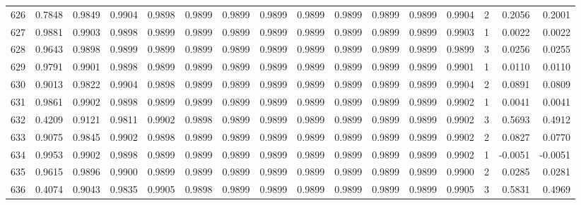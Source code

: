 \begin{tabular}{lrrrrrrrrrrrrrrr}
626 &      0.7848 &  0.9849 &  0.9904 &  0.9898 &  0.9899 &  0.9899 &  0.9899 &  0.9899 &  0.9899 &  0.9899 &   0.9899 &     0.9904 &      2 &                    0.2056 &                     0.2001 \\
627 &      0.9881 &  0.9903 &  0.9898 &  0.9899 &  0.9899 &  0.9899 &  0.9899 &  0.9899 &  0.9899 &  0.9899 &   0.9899 &     0.9903 &      1 &                    0.0022 &                     0.0022 \\
628 &      0.9643 &  0.9898 &  0.9899 &  0.9899 &  0.9899 &  0.9899 &  0.9899 &  0.9899 &  0.9899 &  0.9899 &   0.9899 &     0.9899 &      3 &                    0.0256 &                     0.0255 \\
629 &      0.9791 &  0.9901 &  0.9898 &  0.9899 &  0.9899 &  0.9899 &  0.9899 &  0.9899 &  0.9899 &  0.9899 &   0.9899 &     0.9901 &      1 &                    0.0110 &                     0.0110 \\
630 &      0.9013 &  0.9822 &  0.9904 &  0.9898 &  0.9899 &  0.9899 &  0.9899 &  0.9899 &  0.9899 &  0.9899 &   0.9899 &     0.9904 &      2 &                    0.0891 &                     0.0809 \\
631 &      0.9861 &  0.9902 &  0.9898 &  0.9899 &  0.9899 &  0.9899 &  0.9899 &  0.9899 &  0.9899 &  0.9899 &   0.9899 &     0.9902 &      1 &                    0.0041 &                     0.0041 \\
632 &      0.4209 &  0.9121 &  0.9811 &  0.9902 &  0.9898 &  0.9899 &  0.9899 &  0.9899 &  0.9899 &  0.9899 &   0.9899 &     0.9902 &      3 &                    0.5693 &                     0.4912 \\
633 &      0.9075 &  0.9845 &  0.9902 &  0.9898 &  0.9899 &  0.9899 &  0.9899 &  0.9899 &  0.9899 &  0.9899 &   0.9899 &     0.9902 &      2 &                    0.0827 &                     0.0770 \\
634 &      0.9953 &  0.9902 &  0.9898 &  0.9899 &  0.9899 &  0.9899 &  0.9899 &  0.9899 &  0.9899 &  0.9899 &   0.9899 &     0.9902 &      1 &                   -0.0051 &                    -0.0051 \\
635 &      0.9615 &  0.9896 &  0.9900 &  0.9899 &  0.9899 &  0.9899 &  0.9899 &  0.9899 &  0.9899 &  0.9899 &   0.9899 &     0.9900 &      2 &                    0.0285 &                     0.0281 \\
636 &      0.4074 &  0.9043 &  0.9835 &  0.9905 &  0.9898 &  0.9899 &  0.9899 &  0.9899 &  0.9899 &  0.9899 &   0.9899 &     0.9905 &      3 &                    0.5831 &                     0.4969 \\

\end{tabular}
